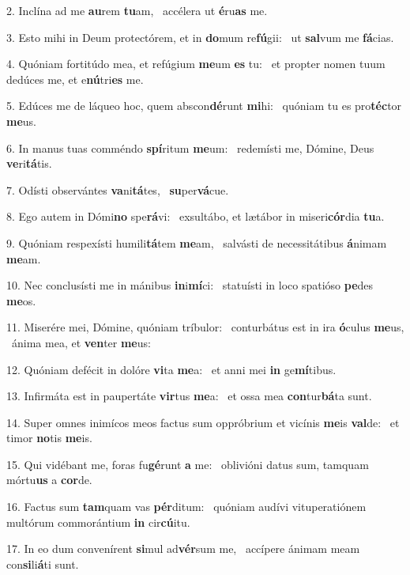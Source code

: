 2. Inclína ad me \textbf{au}rem \textbf{tu}am, \ast\  accélera ut \textbf{é}ru\textbf{as} me.\

3. Esto mihi in Deum protectórem, et in \textbf{do}mum re\textbf{fú}gii: \ast\  ut \textbf{sal}vum me \textbf{fá}cias.\

4. Quóniam fortitúdo mea, et refúgium \textbf{me}um \textbf{es} tu: \ast\  et propter nomen tuum dedúces me, et e\textbf{nú}tri\textbf{es} me.\

5. Edúces me de láqueo hoc, quem abscon\textbf{dé}runt \textbf{mi}hi: \ast\  quóniam tu es pro\textbf{téc}tor \textbf{me}us.\

6. In manus tuas comméndo \textbf{spí}ritum \textbf{me}um: \ast\  redemísti me, Dómine, Deus \textbf{ve}ri\textbf{tá}tis.\

7. Odísti observántes \textbf{va}ni\textbf{tá}tes, \ast\  \textbf{su}per\textbf{vá}cue.\

8. Ego autem in Dómi\textbf{no} spe\textbf{rá}vi: \ast\  exsultábo, et lætábor in miseri\textbf{cór}dia \textbf{tu}a.\

9. Quóniam respexísti humili\textbf{tá}tem \textbf{me}am, \ast\  salvásti de necessitátibus \textbf{á}nimam \textbf{me}am.\

10. Nec conclusísti me in mánibus \textbf{in}i\textbf{mí}ci: \ast\  statuísti in loco spatióso \textbf{pe}des \textbf{me}os.\

11. Miserére mei, Dómine, quóniam tríbulor: \dag\  conturbátus est in ira \textbf{ó}culus \textbf{me}us, \ast\  ánima mea, et \textbf{ven}ter \textbf{me}us:\

12. Quóniam defécit in dolóre \textbf{vi}ta \textbf{me}a: \ast\  et anni mei \textbf{in} ge\textbf{mí}tibus.\

13. Infirmáta est in paupertáte \textbf{vir}tus \textbf{me}a: \ast\  et ossa mea \textbf{con}tur\textbf{bá}ta sunt.\

14. Super omnes inimícos meos factus sum oppróbrium et vicínis \textbf{me}is \textbf{val}de: \ast\  et timor \textbf{no}tis \textbf{me}is.\

15. Qui vidébant me, foras fu\textbf{gé}runt \textbf{a} me: \ast\  oblivióni datus sum, tamquam mórtu\textbf{us} a \textbf{cor}de.\

16. Factus sum \textbf{tam}quam vas \textbf{pér}ditum: \ast\  quóniam audívi vituperatiónem multórum commorántium \textbf{in} cir\textbf{cú}itu.\

17. In eo dum convenírent \textbf{si}mul ad\textbf{vér}sum me, \ast\  accípere ánimam meam con\textbf{si}li\textbf{á}ti sunt.\


